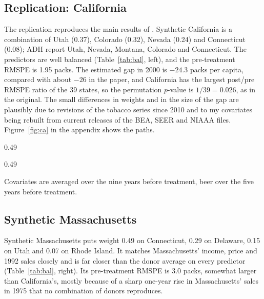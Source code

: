 \documentclass[11pt]{article}
\begin{document}
\subsection{Replication: California}\label{sec:repl}
The replication reproduces the main results of \citet{adh2010}. Synthetic
California is a combination of Utah (0.37), Colorado (0.32), Nevada (0.24) and
Connecticut (0.08); ADH report Utah, Nevada, Montana, Colorado and Connecticut.
The predictors are well balanced (Table~\ref{tab:bal}, left), and the
pre-treatment RMSPE is 1.95 packs. The estimated gap in 2000 is $-24.3$ packs
per capita, compared with about $-26$ in the paper, and California has the
largest post/pre RMSPE ratio of the 39 states, so the permutation $p$-value is
$1/39 = 0.026$, as in the original. The small differences in weights and in
the size of the gap are plausibly due to revisions of the tobacco series since
2010 and to my covariates being rebuilt from current releases of the BEA, SEER
and NIAAA files. Figure~\ref{fig:ca} in the appendix shows the paths.

\begin{table}[H]\centering\small
\caption{Predictor balance: treated state, synthetic control and donor average.}\label{tab:bal}
\begin{subtable}{0.49\textwidth}\centering\resizebox{\linewidth}{!}{}
\caption{California (1989)}\end{subtable}\hfill
\begin{subtable}{0.49\textwidth}\centering\resizebox{\linewidth}{!}{}
\caption{Massachusetts (1993)}\end{subtable}
\par\smallskip\footnotesize Covariates are averaged over the nine years before
treatment, beer over the five years before treatment.
\end{table}

\subsection{Synthetic Massachusetts}
Synthetic Massachusetts puts weight 0.49 on Connecticut, 0.29 on Delaware, 0.15
on Utah and 0.07 on Rhode Island. It matches Massachusetts' income, price and
1992 sales closely and is far closer than the donor average on every predictor
(Table~\ref{tab:bal}, right). Its pre-treatment RMSPE is 3.0 packs, somewhat
larger than California's, mostly because of a sharp one-year rise in
Massachusetts' sales in 1975 that no combination of donors reproduces.
\end{document}
